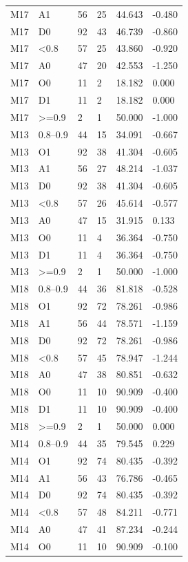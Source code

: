 {\begin{longtable}{llllll}
M17 & A1 & 56 & 25 & 44.643 & -0.480 \\
M17 & D0 & 92 & 43 & 46.739 & -0.860 \\
M17 & \textless{}0.8 & 57 & 25 & 43.860 & -0.920 \\
M17 & A0 & 47 & 20 & 42.553 & -1.250 \\
M17 & O0 & 11 & 2 & 18.182 & 0.000 \\
M17 & D1 & 11 & 2 & 18.182 & 0.000 \\
M17 & \textgreater{}=0.9 & 2 & 1 & 50.000 & -1.000 \\
M13 & 0.8–0.9 & 44 & 15 & 34.091 & -0.667 \\
M13 & O1 & 92 & 38 & 41.304 & -0.605 \\
M13 & A1 & 56 & 27 & 48.214 & -1.037 \\
M13 & D0 & 92 & 38 & 41.304 & -0.605 \\
M13 & \textless{}0.8 & 57 & 26 & 45.614 & -0.577 \\
M13 & A0 & 47 & 15 & 31.915 & 0.133 \\
M13 & O0 & 11 & 4 & 36.364 & -0.750 \\
M13 & D1 & 11 & 4 & 36.364 & -0.750 \\
M13 & \textgreater{}=0.9 & 2 & 1 & 50.000 & -1.000 \\
M18 & 0.8–0.9 & 44 & 36 & 81.818 & -0.528 \\
M18 & O1 & 92 & 72 & 78.261 & -0.986 \\
M18 & A1 & 56 & 44 & 78.571 & -1.159 \\
M18 & D0 & 92 & 72 & 78.261 & -0.986 \\
M18 & \textless{}0.8 & 57 & 45 & 78.947 & -1.244 \\
M18 & A0 & 47 & 38 & 80.851 & -0.632 \\
M18 & O0 & 11 & 10 & 90.909 & -0.400 \\
M18 & D1 & 11 & 10 & 90.909 & -0.400 \\
M18 & \textgreater{}=0.9 & 2 & 1 & 50.000 & 0.000 \\
M14 & 0.8–0.9 & 44 & 35 & 79.545 & 0.229 \\
M14 & O1 & 92 & 74 & 80.435 & -0.392 \\
M14 & A1 & 56 & 43 & 76.786 & -0.465 \\
M14 & D0 & 92 & 74 & 80.435 & -0.392 \\
M14 & \textless{}0.8 & 57 & 48 & 84.211 & -0.771 \\
M14 & A0 & 47 & 41 & 87.234 & -0.244 \\
M14 & O0 & 11 & 10 & 90.909 & -0.100 \\

\end{longtable}}
